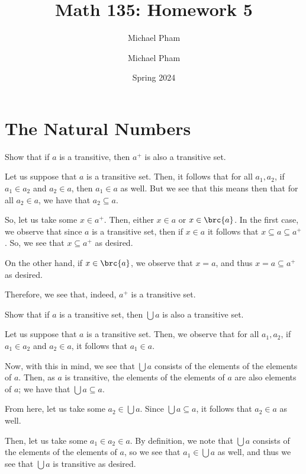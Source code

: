 \documentclass{article}
\title{#1}
\author{Michael Pham}
\date{#2}
\renewcommand{\mytitle}[2]{%
	\title{#1}
	\author{Michael Pham}
	\date{#2}
	\maketitle
	\newpage
	\listoftheorems
	\newpage
}
\begin{document}
\mytitle{Math 135: Homework 5}{Spring 2024}

\setcounter{section}{3}
\section{The Natural Numbers}
\begin{hw}{2}
	Show that if $a$ is a transitive, then $a^{+}$ is also a transitive set.
\end{hw}
\begin{solution}
	Let us suppose that $a$ is a transitive set. Then, it follows that for all $a_{1}, a_{2}$, if $a_{1} \in a_{2}$ and $a_{2} \in a$, then $a_{1} \in a$ as well. But we see that this means then that for all $a_{2} \in a$, we have that $a_{2} \subseteq a$.
	
	
	So, let us take some $x \in a^{+}$. Then, either $x\in a$ or $x \in \brc{a}$. In the first case, we observe that since $a$ is a transitive set, then if $x \in a$ it follows that $x \subseteq a \subseteq a^{+}$. So, we see that $x \subseteq a^{+}$ as desired.
	
	On the other hand, if $x \in \brc{a}$, we observe that $x = a$, and thus $x = a \subseteq a^{+}$ as desired.
	
	Therefore, we see that, indeed, $a^{+}$ is a transitive set.
\end{solution}

\begin{hw}{4}
	Show that if $a$ is a transitive set, then $\bigcup a$ is also a transitive set.
\end{hw}
\begin{solution}
	Let us suppose that $a$ is a transitive set. Then, we observe that for all $a_{1}, a_{2}$, if $a_{1} \in a_{2}$ and $a_{2} \in a$, it follows that $a_{1} \in a$.
	
	Now, with this in mind, we see that $\bigcup a$ consists of the elements of the elements of $a$. Then, as $a$ is transitive, the elements of the elements of $a$ are also elements of $a$; we have that $\bigcup a \subseteq a$.
	
	From here, let us take some $a_{2} \in \bigcup a$. Since $\bigcup a \subseteq a$, it follows that $a_{2} \in a$ as well.
	
	Then, let us take some $a_{1} \in a_{2} \in a$. By definition, we note that $\bigcup a$ consists of the elements of the elements of $a$, so we see that $a_{1} \in \bigcup a$ as well, and thus we see that $\bigcup a$ is transitive as desired.
\end{solution}
\end{document}
